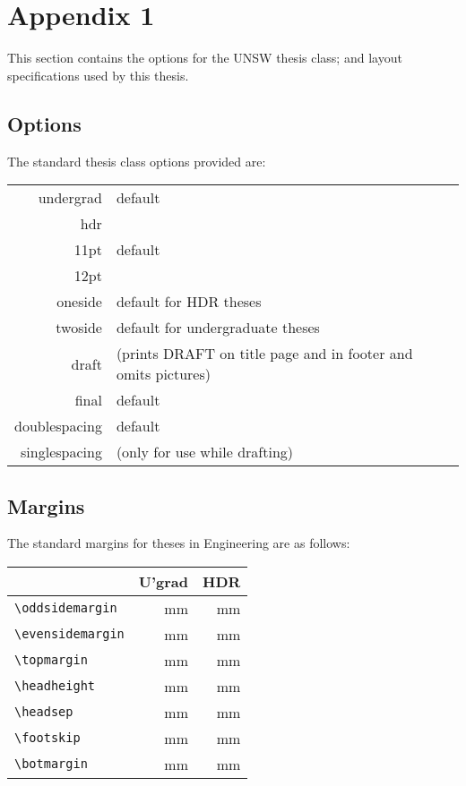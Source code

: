 \chapter{Appendix 1}\label{app1}

This section contains the options for the UNSW thesis class; and
layout specifications used by this thesis.

\section{Options}

The standard thesis class options provided are:

\qquad
\begin{tabular}{rl}
undergrad & default \\
hdr & \\[2ex]
11pt & default\\
12pt &\\[2ex]
oneside & default for HDR theses\\
twoside & default for undergraduate theses\\[2ex]
draft & (prints DRAFT on title page and in footer and omits pictures)\\
final & default\\[2ex]
doublespacing & default\\
singlespacing & (only for use while drafting)
\end{tabular}

\section{Margins}

The standard margins for theses in Engineering are as follows:

\qquad
\begin{tabular}{|l|r|r|}
\hline
 & U'grad & HDR\\\hline
{\verb+\oddsidemargin+} & \unit[40]{mm} & \unit[40]{mm}\\
{\verb+\evensidemargin+} & \unit[25]{mm} & \unit[20]{mm}\\
{\verb+\topmargin+} & \unit[25]{mm} & \unit[30]{mm}\\
{\verb+\headheight+} & \unit[40]{mm} & \unit[40]{mm}\\
{\verb+\headsep+} & \unit[40]{mm} & \unit[40]{mm}\\
{\verb+\footskip+} & \unit[15]{mm} & \unit[15]{mm}\\
{\verb+\botmargin+} & \unit[20]{mm} & \unit[20]{mm}\\
\hline
\end{tabular}

